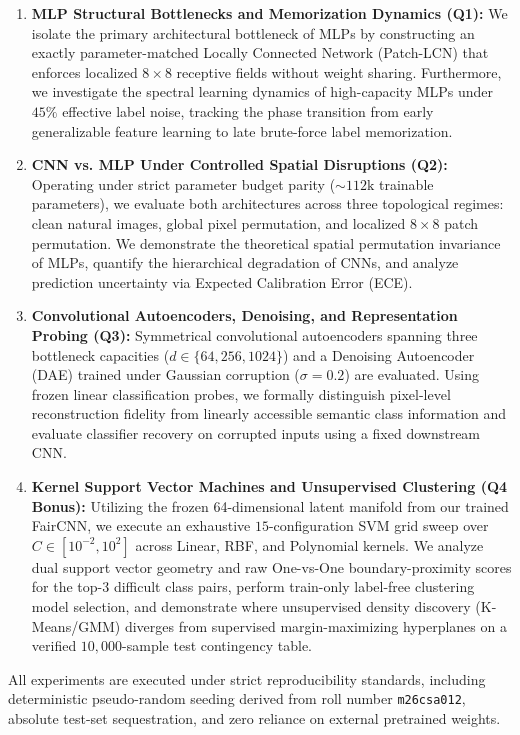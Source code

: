 \begin{enumerate}
    \item \textbf{MLP Structural Bottlenecks and Memorization Dynamics (Q1):} We isolate the primary architectural bottleneck of MLPs by constructing an exactly parameter-matched Locally Connected Network (Patch-LCN) that enforces localized $8 \times 8$ receptive fields without weight sharing. Furthermore, we investigate the spectral learning dynamics of high-capacity MLPs under $45\%$ effective label noise, tracking the phase transition from early generalizable feature learning to late brute-force label memorization.
    \item \textbf{CNN vs. MLP Under Controlled Spatial Disruptions (Q2):} Operating under strict parameter budget parity ($\sim 112\text{k}$ trainable parameters), we evaluate both architectures across three topological regimes: clean natural images, global pixel permutation, and localized $8 \times 8$ patch permutation. We demonstrate the theoretical spatial permutation invariance of MLPs, quantify the hierarchical degradation of CNNs, and analyze prediction uncertainty via Expected Calibration Error (ECE).
    \item \textbf{Convolutional Autoencoders, Denoising, and Representation Probing (Q3):} Symmetrical convolutional autoencoders spanning three bottleneck capacities ($d \in \{64, 256, 1024\}$) and a Denoising Autoencoder (DAE) trained under Gaussian corruption ($\sigma=0.2$) are evaluated. Using frozen linear classification probes, we formally distinguish pixel-level reconstruction fidelity from linearly accessible semantic class information and evaluate classifier recovery on corrupted inputs using a fixed downstream CNN.
    \item \textbf{Kernel Support Vector Machines and Unsupervised Clustering (Q4 Bonus):} Utilizing the frozen 64-dimensional latent manifold from our trained FairCNN, we execute an exhaustive $15$-configuration SVM grid sweep over $C \in [10^{-2}, 10^{2}]$ across Linear, RBF, and Polynomial kernels. We analyze dual support vector geometry and raw One-vs-One boundary-proximity scores for the top-3 difficult class pairs, perform train-only label-free clustering model selection, and demonstrate where unsupervised density discovery (K-Means/GMM) diverges from supervised margin-maximizing hyperplanes on a verified $10{,}000$-sample test contingency table.
\end{enumerate}

All experiments are executed under strict reproducibility standards, including deterministic pseudo-random seeding derived from roll number \texttt{m26csa012}, absolute test-set sequestration, and zero reliance on external pretrained weights.
